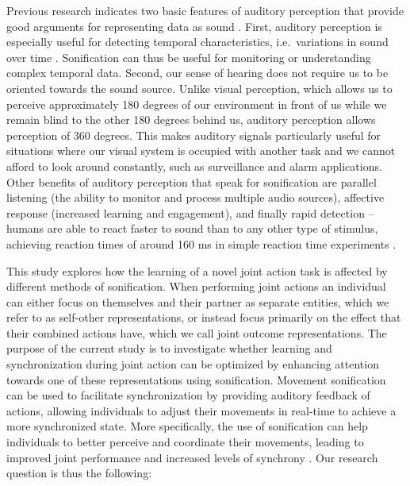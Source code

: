 \documentclass[10pt,a4paper,onecolumn]{article}
\begin{document}
Previous research indicates two basic features of auditory perception that provide good arguments for representing data as sound \autocite{kramerSonificationReportStatus1999}. First, auditory perception is especially useful for detecting temporal characteristics, i.e.~variations in sound over time \autocite{hildebrandtShortPaperEnhancing2014}. Sonification can thus be useful for monitoring or understanding complex temporal data. Second, our sense of hearing does not require us to be oriented towards the sound source. Unlike visual perception, which allows us to perceive approximately 180 degrees of our environment in front of us while we remain blind to the other 180 degrees behind us, auditory perception allows perception of 360 degrees. This makes auditory signals particularly useful for situations where our visual system is occupied with another task and we cannot afford to look around constantly, such as surveillance and alarm applications. Other benefits of auditory perception that speak for sonification are parallel listening (the ability to monitor and process multiple audio sources), affective response (increased learning and engagement), and finally rapid detection -- humans are able to react faster to sound than to any other type of stimulus, achieving reaction times of around 160 ms in simple reaction time experiments \autocite{kosinskiLiteratureReviewReaction2008,kramerSonificationReportStatus1999}.

This study explores how the learning of a novel joint action task is affected by different methods of sonification. When performing joint actions an individual can either focus on themselves and their partner as separate entities, which we refer to as self-other representations, or instead focus primarily on the effect that their combined actions have, which we call joint outcome representations. The purpose of the current study is to investigate whether learning and synchronization during joint action can be optimized by enhancing attention towards one of these representations using sonification. Movement sonification can be used to facilitate synchronization by providing auditory feedback of actions, allowing individuals to adjust their movements in real-time to achieve a more synchronized state. More specifically, the use of sonification can help individuals to better perceive and coordinate their movements, leading to improved joint performance and increased levels of synchrony \autocite{dotovEntrainingChaoticDynamics2018}. Our research question is thus the following:
\end{document}
